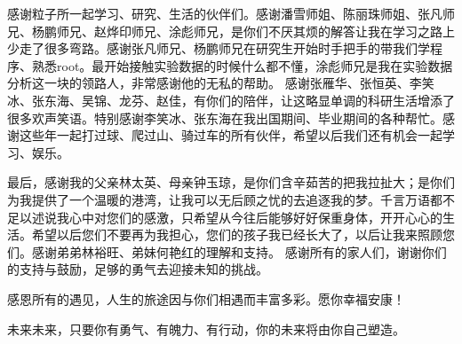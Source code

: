 感谢粒子所一起学习、研究、生活的伙伴们。感谢潘雪师姐、陈丽珠师姐、张凡师兄、杨鹏师兄、赵烨印师兄、涂彪师兄，是你们不厌其烦的解答让我在学习之路上少走了很多弯路。感谢张凡师兄、杨鹏师兄在研究生开始时手把手的带我们学程序、熟悉root。最开始接触实验数据的时候什么都不懂，涂彪师兄是我在实验数据分析这一块的领路人，非常感谢他的无私的帮助。
感谢张雁华、张恒英、李笑冰、张东海、吴锦、龙芬、赵佳，有你们的陪伴，让这略显单调的科研生活增添了很多欢声笑语。特别感谢李笑冰、张东海在我出国期间、毕业期间的各种帮忙。感谢这些年一起打过球、爬过山、骑过车的所有伙伴，希望以后我们还有机会一起学习、娱乐。


最后，感谢我的父亲林太英、母亲钟玉琼，是你们含辛茹苦的把我拉扯大；是你们为我提供了一个温暖的港湾，让我可以无后顾之忧的去追逐我的梦。千言万语都不足以述说我心中对您们的感激，只希望从今往后能够好好保重身体，开开心心的生活。希望以后您们不要再为我担心，您们的孩子我已经长大了，以后让我来照顾您们。感谢弟弟林裕旺、弟妹何艳红的理解和支持。
感谢所有的家人们，谢谢你们的支持与鼓励，足够的勇气去迎接未知的挑战。

感恩所有的遇见，人生的旅途因与你们相遇而丰富多彩。愿你幸福安康！

未来未来，只要你有勇气、有魄力、有行动，你的未来将由你自己塑造。
